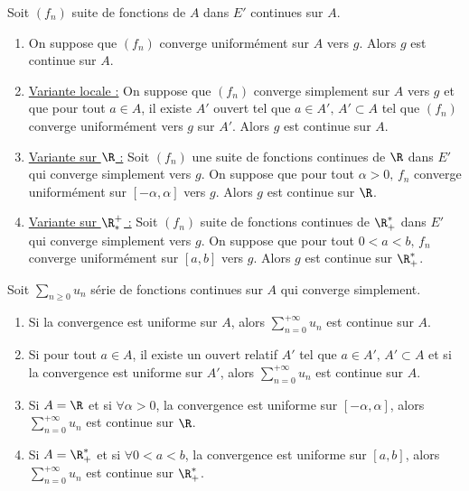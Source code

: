 \begin{theoreme}{}{}
    Soit $(f_n)$ suite de fonctions de $A$ dans $E'$ continues sur $A$.

    \begin{enumerate}
        \item On suppose que $(f_n)$ converge uniformément sur $A$ vers $g$. Alors $g$ est continue sur $A$.

        \item \uline{Variante locale :}
         On suppose que $(f_n)$ converge simplement sur $A$ vers $g$ et que pour tout $a \in A$,
        il existe $A'$ ouvert tel que $a \in A', \, A' \subset A$ tel que $(f_n)$ converge uniformément vers $g$ sur $A'$.
        Alors $g$ est continue sur $A$.

        \item \uline{Variante sur $\R$ :}
        Soit $(f_n)$ une suite de fonctions continues de $\R$ dans $E'$ qui converge simplement vers $g$. 
        On suppose que pour tout $\alpha > 0, \, f_n$ converge uniformément sur $[-\alpha, \alpha]$ vers $g$.
        Alors $g$ est continue sur $\R$.

        \item \uline{Variante sur $\R^+_*$ :} Soit $(f_n)$ suite de fonctions continues de $\R_+^*$ dans $E'$ qui converge simplement vers $g$. 
        On suppose que pour tout $0<a<b, \, f_n$ converge uniformément sur $[a, b]$ vers $g$.
        Alors $g$ est continue sur $\R_+^*$.
    \end{enumerate}
    
\end{theoreme}

\begin{theoreme}{}{}
    Soit $\sum_{n \geqslant 0 } u_n$ série de fonctions continues sur $A$ qui converge 
    simplement. 

    \begin{enumerate}
        \item Si la convergence est uniforme sur $A$, alors $\displaystyle \sum_{n = 0}^{+ \infty} u_n$ est continue sur $A$.
        \item Si pour tout $a \in A$, il existe un ouvert relatif $A'$ tel que $a \in A', \, A' \subset A$ et
        si la convergence est uniforme sur $A'$, alors $\displaystyle \sum_{n = 0}^{+ \infty} u_n$ est continue sur $A$.
        \item Si $A = \R$ et si $\forall \alpha > 0$, la convergence est uniforme sur $[-\alpha, \alpha]$, 
        alors $\displaystyle \sum_{n = 0}^{+ \infty} u_n$ est continue sur $\R$.
        \item Si $A = \R_+^*$ et si $\forall 0 < a < b$, la convergence est uniforme sur $[a, b]$,
        alors $\displaystyle \sum_{n = 0}^{+ \infty} u_n$ est continue sur $\R_+^*$.
    \end{enumerate}
\end{theoreme}

